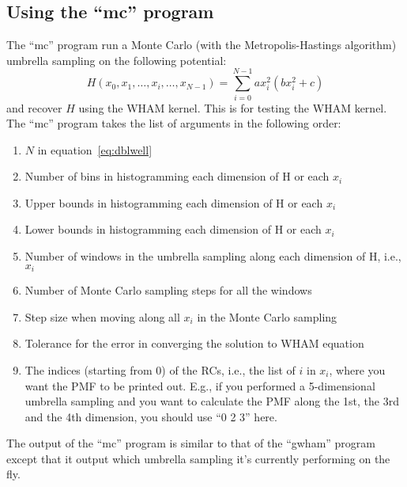 \subsection{Using the ``mc'' program}
The ``mc'' program run a Monte Carlo (with the Metropolis-Hastings
algorithm) umbrella sampling on the following potential:
\begin{equation}
H(x_{0}, x_{1}, \dotsc, x_{i}, \dotsc, x_{N-1}) = \sum_{i=0}^{N-1} a x_{i}^{2}(b x_{i}^{2} + c)
\label{eq:dblwell}
\end{equation}
and recover $H$ using the WHAM kernel. This is for testing the WHAM kernel.
The ``mc'' program takes the list of arguments in the following order:
\begin{enumerate}
  \item $N$ in equation~\ref{eq:dblwell}
  \item Number of bins in histogramming each dimension of H or each $x_{i}$
  \item Upper bounds in histogramming each dimension of H or each $x_{i}$
  \item Lower bounds in histogramming each dimension of H or each $x_{i}$
  \item Number of windows in the umbrella sampling along each dimension of H, i.e., $x_{i}$
  \item Number of Monte Carlo sampling steps for all the windows
  \item Step size when moving along all $x_{i}$ in the Monte Carlo sampling
  \item Tolerance for the error in converging the solution to WHAM equation
  \item The indices (starting from $0$) of the RCs, i.e., the list of $i$ in
  $x_{i}$, where you want the PMF to be printed out. E.g., if you performed a
  5-dimensional umbrella sampling and you want to calculate the PMF along the
  1st, the 3rd and the 4th dimension, you should use ``0 2 3'' here.
\end{enumerate}
The output of the ``mc'' program is similar to that of the ``gwham'' program
except that it output which umbrella sampling it's currently performing on the
fly.


